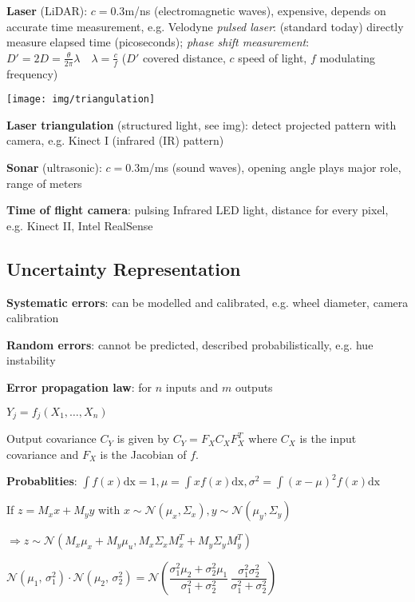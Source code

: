 \documentclass[fontsize=6pt]{scrartcl}
\begin{document}
\begin{multicols*}{4}
\textbf{Laser} (LiDAR):	$c = 0.3$m/ns (electromagnetic waves), expensive, depends on accurate time measurement, e.g. Velodyne
\textit{pulsed laser}: (standard today) directly measure elapsed time (picoseconds); \textit{phase shift measurement}:
$D' = 2D = \frac{\theta}{2 \pi}\lambda\quad \lambda=\frac{c}{f}$ ($D'$ covered distance, $c$ speed of light, $f$ modulating frequency)

\begin{minipage}{0.58\linewidth}
\texttt{[image: img/triangulation]}
\end{minipage}
\begin{minipage}{0.42\linewidth}
\textbf{Laser triangulation} (structured light, see img): detect projected pattern with camera, e.g. Kinect I (infrared (IR) pattern)

\textbf{Sonar} (ultrasonic): $c = 0.3$m/ms (sound waves), opening angle plays major role, range of meters

\textbf{Time of flight camera}: pulsing Infrared LED light, distance for every pixel, e.g. Kinect II, Intel RealSense
\end{minipage}

\subsection*{Uncertainty Representation}
\textbf{Systematic errors}: can be modelled and calibrated, e.g. wheel diameter, camera calibration

\textbf{Random errors}: cannot be predicted, described probabilistically, e.g. hue instability

\textbf{Error propagation law}: for $n$ inputs and $m$ outputs

$Y_j = f_j(X_1, \ldots, X_n)$

Output covariance $C_Y$ is given by $C_Y=F_X C_X F_X^T$ where $C_X$ is the input covariance and $F_X$ is the Jacobian of $f$.

\textbf{Probablities}: $ \int f(x) \text{dx} = 1, \mu = \int x f(x) \text{dx}, \sigma^2 = \int (x-\mu)^2 f(x) \text{dx}$

If $z = M_x x + M_y y$ with $ x\sim \mathcal{N}(\mu_x, \Sigma_x), y\sim \mathcal{N}(\mu_y, \Sigma_y) $

$\Rightarrow z\sim \mathcal{N}(M_x \mu_x + M_y \mu_u, M_x \Sigma_x M_x^T + M_y \Sigma_y M_y^T)$

$
\mathcal{N}(\mu_{1},\,\sigma^{2}_{1})\cdot\mathcal{N}(\mu_{2},\,\sigma^{2}_{2})= \mathcal{N}\left(\dfrac{\sigma^{2}_{1}\mu_{2}+\sigma^{2}_{2}\mu_{1}}{\sigma^{2}_{1}+\sigma^{2}_{2}}\,\dfrac{\sigma^{2}_{1}\sigma^{2}_{2}}{\sigma^{2}_{1}+\sigma^{2}_{2}}\right)
$



\end{multicols*}
\end{document}
